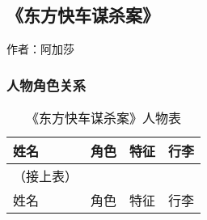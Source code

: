 \subsection{《东方快车谋杀案》}

作者：阿加莎

\subsubsection{人物角色关系}
\begin{longtable}{p{} | p{} | p{} | p{}}

    \caption{《东方快车谋杀案》人物表} \\
    \hline
姓名 & 角色  & 特征 & 行李 \\
\hline
\endfirsthead

（接上表） \\
姓名 & 角色 & 特征 & 行李 \\
\hline
\endhead


\end{longtable}

